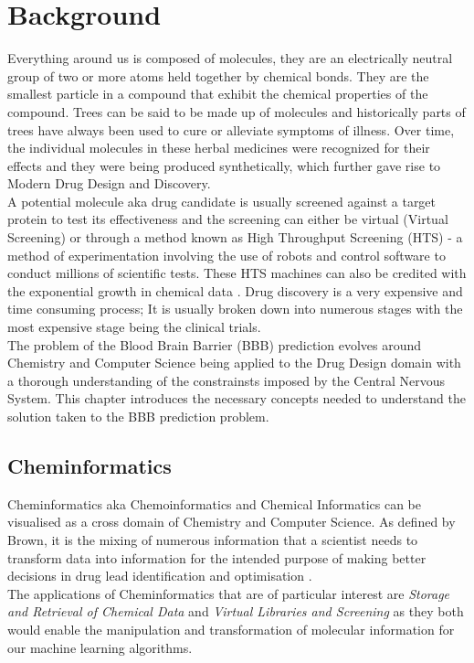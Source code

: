 \documentclass[a4paper,12pt]{report}
\begin{document}
\chapter{Background}
	Everything around us is composed of molecules, they are an electrically neutral group of two or more atoms held together by chemical bonds. They are the smallest particle in a compound that exhibit the chemical properties of the compound. 
	Trees can be said to be made up of molecules and historically parts of trees have always been used to cure or alleviate symptoms of illness. Over time, the individual molecules in these herbal medicines were recognized for their effects and they were being produced synthetically, which further gave rise to Modern Drug Design and Discovery. \\
	A potential molecule aka drug candidate is usually screened against a target protein to test its effectiveness and the screening can either be virtual (Virtual Screening) or through a method known as High Throughput Screening (HTS) - a method of experimentation involving the use of robots and control software to conduct millions of scientific tests. These HTS machines can also be credited with the exponential growth in chemical data \cite{Dougetal2008}.
	Drug discovery is a very expensive and time consuming process; It is usually broken down into numerous stages with the most expensive stage being the clinical trials. \\
	The problem of the Blood Brain Barrier (BBB) prediction evolves around Chemistry and Computer Science being applied to the Drug Design domain with a thorough understanding of the constrainsts imposed by the Central Nervous System. This chapter introduces the necessary concepts needed to understand the solution taken to the BBB prediction problem.
	
	
	\section{Cheminformatics}
	Cheminformatics aka Chemoinformatics and Chemical Informatics can be visualised as a cross domain of Chemistry and Computer Science. As defined by Brown, it is the mixing of numerous information that a scientist needs to transform data into information for the intended purpose of making better decisions in drug lead identification and optimisation \cite{FKBrown1998}. \\
	The applications of Cheminformatics that are of particular interest are \textit{Storage and Retrieval of Chemical Data} and \textit{Virtual Libraries and Screening} as they both would enable the manipulation and transformation of molecular information for our machine learning algorithms. 
\end{document}
